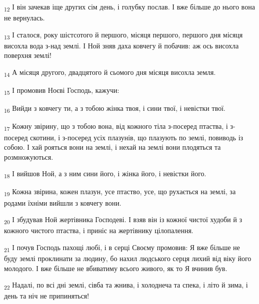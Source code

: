 \begin{tcolorbox}
\textsubscript{12} І він зачекав іще других сім день, і голубку послав. І вже більше до нього вона не вернулась.
\end{tcolorbox}
\begin{tcolorbox}
\textsubscript{13} І сталося, року шістсотого й першого, місяця першого, першого дня місяця висохла вода з-над землі. І Ной зняв даха ковчегу й побачив: аж ось висохла поверхня землі!
\end{tcolorbox}
\begin{tcolorbox}
\textsubscript{14} А місяця другого, двадцятого й сьомого дня місяця висохла земля.
\end{tcolorbox}
\begin{tcolorbox}
\textsubscript{15} І промовив Ноєві Господь, кажучи:
\end{tcolorbox}
\begin{tcolorbox}
\textsubscript{16} Вийди з ковчегу ти, а з тобою жінка твоя, і сини твої, і невістки твої.
\end{tcolorbox}
\begin{tcolorbox}
\textsubscript{17} Кожну звірину, що з тобою вона, від кожного тіла з-посеред птаства, і з-посеред скотини, і з-посеред усіх плазунів, що плазують по землі, повиводь із собою. І хай рояться вони на землі, і нехай на землі вони плодяться та розмножуються.
\end{tcolorbox}
\begin{tcolorbox}
\textsubscript{18} І вийшов Ной, а з ним сини його, і жінка його, і невістки його.
\end{tcolorbox}
\begin{tcolorbox}
\textsubscript{19} Кожна звірина, кожен плазун, усе птаство, усе, що рухається на землі, за родами їхніми вийшли з ковчегу вони.
\end{tcolorbox}
\begin{tcolorbox}
\textsubscript{20} І збудував Ной жертівника Господеві. І взяв він із кожної чистої худоби й з кожного чистого птаства, і приніс на жертівнику цілопалення.
\end{tcolorbox}
\begin{tcolorbox}
\textsubscript{21} І почув Господь пахощі любі, і в серці Своєму промовив: Я вже більше не буду землі проклинати за людину, бо нахил людського серця лихий від віку його молодого. І вже більше не вбиватиму всього живого, як то Я вчинив був.
\end{tcolorbox}
\begin{tcolorbox}
\textsubscript{22} Надалі, по всі дні землі, сівба та жнива, і холоднеча та спека, і літо й зима, і день та ніч не припиняться!
\end{tcolorbox}
